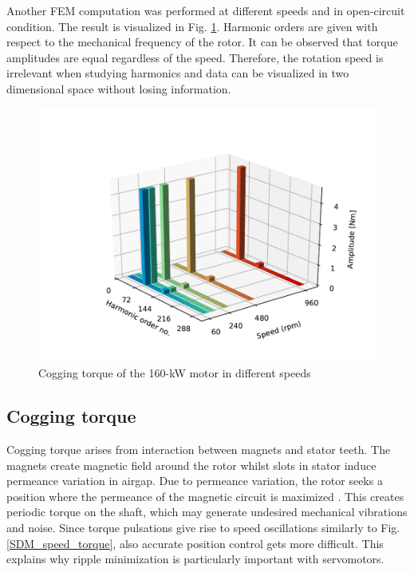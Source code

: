 Another FEM computation was performed at different speeds and in open-circuit condition. The result is visualized in Fig. \ref{FEM_orders}. Harmonic orders are given with respect to the mechanical frequency of the rotor. It can be observed that torque amplitudes are equal regardless of the speed. Therefore, the rotation speed is irrelevant when studying harmonics and data can be visualized in two dimensional space without losing information.
\begin{figure}[htb] 
    \centering
    \includegraphics[width=1.0\linewidth]{images/cogging-different-speeds.pdf} 
    \caption{Cogging torque of the 160-kW motor in different speeds}
    \label{FEM_orders}
\end{figure}


\subsection{Cogging torque}
Cogging torque arises from interaction between magnets and stator teeth. The magnets create magnetic field around the rotor whilst slots in stator induce permeance variation in airgap. Due to permeance variation, the rotor seeks a position where the permeance of the magnetic circuit is maximized \cite{TRR:1999, CTR_HW:2013}. This creates periodic torque on the shaft, which may generate undesired mechanical vibrations and noise. Since torque pulsations give rise to speed oscillations similarly to Fig. \ref{SDM_speed_torque}, also accurate position control gets more difficult. This explains why ripple minimization is particularly important with servomotors. 


